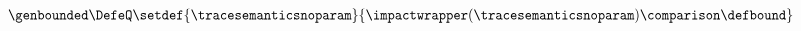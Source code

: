 \begin{gather*}
  \genbounded\DefeQ
  \setdef{\tracesemanticsnoparam}{\impactwrapper(\tracesemanticsnoparam)\comparison \defbound}
\end{gather*}
